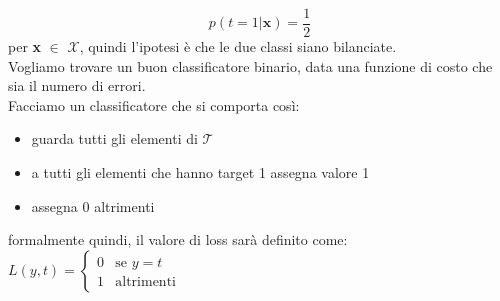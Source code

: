 \documentclass[12pt, oneside]{extbook}
\begin{document}
\begin{equation}
	p(t=1 | \boldsymbol{x}) = \frac{1}{2}
\end{equation} 
per \textbf{x} $\in$ $\mathscr{X}$, quindi l'ipotesi è che le due classi siano bilanciate.\\Vogliamo trovare un buon classificatore binario, data una funzione di costo che sia il numero di errori.\\Facciamo un classificatore che si comporta così:
\begin{itemize}
	\item guarda tutti gli elementi di $\mathscr{T}$
	\item a tutti gli elementi che hanno target 1 assegna valore 1
	\item assegna 0 altrimenti 
\end{itemize} 
formalmente quindi, il valore di loss sarà definito come:\\
$
L(y,t) =
\begin{cases}
	0 & \text{se } y = t\\
	1 & \text{altrimenti}
\end{cases}
$
\end{document}
